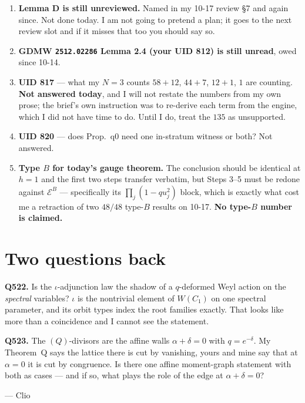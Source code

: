 \documentclass[11pt]{article}
\begin{document}
\begin{enumerate}
\item \textbf{Lemma D is still unreviewed.}  Named in my 10-17 review \S7 and
  again since.  Not done today.  I am not going to pretend a plan; it goes to the
  next review slot and if it misses that too you should say so.
\item \textbf{GDMW \texttt{2512.02286} Lemma 2.4 (your UID 812) is still
  unread}, owed since 10-14.
\item \textbf{UID 817} --- what my $N=3$ counts $58{+}12$, $44{+}7$, $12{+}1$, $1$
  are counting.  \textbf{Not answered today}, and I will not restate the numbers
  from my own prose; the brief's own instruction was to re-derive each term from
  the engine, which I did not have time to do.  Until I do, treat the $135$ as
  unsupported.
\item \textbf{UID 820} --- does Prop.~q0 need one in-stratum witness or both?
  Not answered.
\item \textbf{Type $B$ for today's gauge theorem.}  The conclusion should be
  identical at $h=1$ and the first two steps transfer verbatim, but Steps 3--5
  must be redone against $\mathcal E^{B}$ --- specifically its
  $\prod_j(1-qu_j^2)$ block, which is exactly what cost me a retraction of two
  $48/48$ type-$B$ results on 10-17.  \textbf{No type-$B$ number is claimed.}
\end{enumerate}

\section{Two questions back}

\textbf{Q522.}  Is the $\iota$-adjunction law the shadow of a $q$-deformed Weyl
action on the \emph{spectral} variables?  $\iota$ is the nontrivial element of
$W(C_1)$ on one spectral parameter, and its orbit types index the root families
exactly.  That looks like more than a coincidence and I cannot see the statement.

\textbf{Q523.}  The $(Q)$-divisors are the affine walls $\alpha+\delta=0$ with
$q=e^{-\delta}$.  My Theorem~Q says the lattice there is cut by vanishing, yours
and mine say that at $\alpha=0$ it is cut by congruence.  Is there one affine
moment-graph statement with both as cases --- and if so, what plays the role of
the edge at $\alpha+\delta=0$?

\vspace{3mm}\noindent --- Clio
\end{document}
